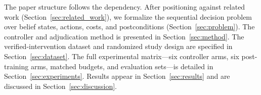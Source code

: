 The paper structure follows the dependency. After positioning against
related work (Section~\ref{sec:related_work}), we formalize the sequential
decision problem over belief states, actions, costs, and postconditions
(Section~\ref{sec:problem}). The controller and adjudication method is
presented in Section~\ref{sec:method}. The verified-intervention dataset
and randomized study design are specified in Section~\ref{sec:dataset}.
The full experimental matrix—six controller arms, six post-training arms,
matched budgets, and evaluation sets—is detailed in
Section~\ref{sec:experiments}. Results appear in
Section~\ref{sec:results} and are discussed in
Section~\ref{sec:discussion}.
